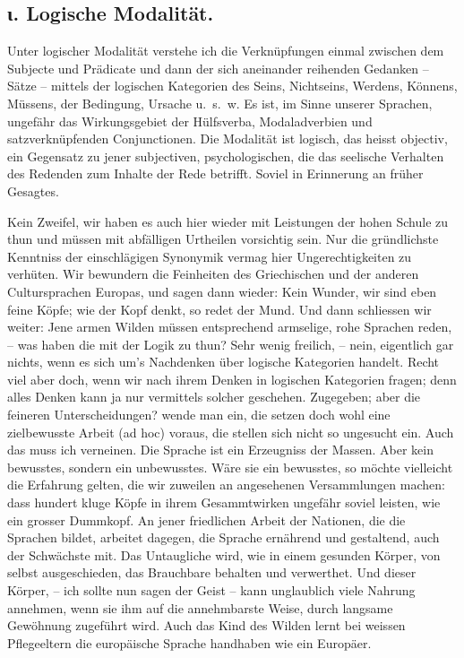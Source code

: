 \subsection*{ι. Logische Modalität.}\label{IV.IV.Iciota}

Unter logischer Modalität verstehe ich die Verknüpfungen einmal zwischen dem Subjecte und Prädicate und dann der sich aneinander reihenden Gedanken – Sätze – mittels der logischen Kategorien des Seins, Nichtseins, Werdens, Könnens, Müssens, der Bedingung, Ursache u.~s.~w. Es ist, im Sinne unserer Sprachen, ungefähr das Wirkungsgebiet der Hülfsverba, Modaladverbien und satzverknüpfenden Conjunctionen. Die Modalität ist logisch, das heisst objectiv, ein Gegensatz zu jener subjectiven, psychologischen, die das seelische Verhalten des Redenden zum Inhalte der Rede betrifft. Soviel in Erinnerung an früher Gesagtes.

Kein Zweifel, wir haben es auch hier wieder mit Leistungen der hohen Schule zu thun und müssen mit abfälligen Urtheilen vorsichtig sein. Nur die gründlichste Kenntniss der einschlägigen Synonymik vermag hier Ungerechtigkeiten zu verhüten. Wir bewundern die Feinheiten des Griechischen und der anderen Cultursprachen Europas, und sagen dann wieder: Kein Wunder, wir sind eben feine Köpfe; wie der Kopf denkt, so redet der Mund. Und dann schliessen wir weiter: Jene armen Wilden müssen entsprechend armselige, rohe Sprachen reden, – was haben die mit der Logik zu thun? Sehr wenig freilich, – nein, eigentlich gar nichts, wenn es sich um’s Nachdenken über logische Kategorien handelt. Recht viel aber doch, wenn wir nach ihrem Denken in logischen Kategorien fragen; denn alles Denken kann ja nur vermittels solcher geschehen. Zugegeben; aber die feineren Unterscheidungen? wende man ein, die setzen doch wohl eine zielbewusste Arbeit (ad hoc) voraus, die stellen sich nicht so ungesucht ein. Auch das muss ich verneinen. Die Sprache ist ein Erzeugniss der Massen. Aber kein bewusstes, sondern ein unbewusstes. Wäre sie ein bewusstes, so möchte vielleicht die Erfahrung gelten, die wir zuweilen an angesehenen Versammlungen machen: dass hundert kluge Köpfe in ihrem Gesammtwirken ungefähr soviel leisten, wie ein grosser Dummkopf. An jener friedlichen Arbeit der Nationen, die die Sprachen bildet, arbeitet dagegen, die Sprache er\label{fp.452}nährend und gestaltend, auch der Schwächste mit. Das Untaugliche wird, wie in einem gesunden Körper, von selbst ausgeschieden, das Brauchbare behalten und verwerthet. Und dieser Körper, – ich sollte nun sagen der Geist – kann unglaublich viele Nahrung annehmen, wenn sie ihm auf die annehmbarste Weise, durch langsame Gewöhnung zugeführt wird. Auch das Kind des Wilden lernt bei weissen Pflegeeltern die europäische Sprache handhaben wie ein Europäer.

